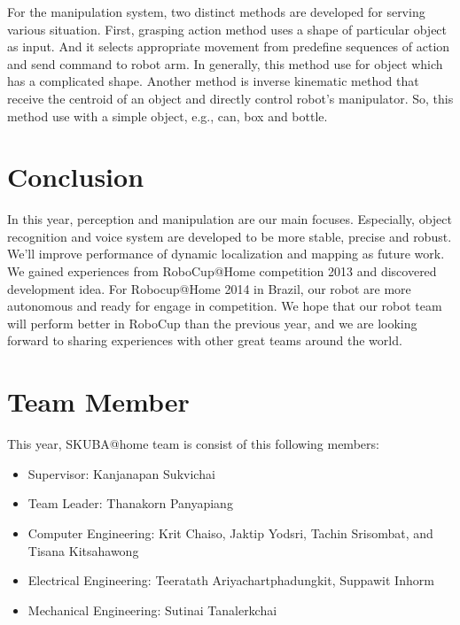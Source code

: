 \documentclass{llncs}
\begin{document}
For the manipulation system, two distinct methods are developed for serving various situation. First, grasping action method uses a shape of particular object as input. And it selects appropriate movement from predefine sequences of action and send command to robot arm. In generally, this method use for object which has a complicated shape. Another method is inverse kinematic method that receive the centroid of an object and directly control robot's manipulator. So, this method use with a simple object, e.g., can, box and bottle.

\section{Conclusion}

In this year, perception and manipulation are our main focuses. Especially, object recognition and voice system are developed to be more stable, precise and robust. We'll improve performance of dynamic localization and mapping as future work. We gained experiences from RoboCup@Home competition 2013 and discovered development idea. For Robocup@Home 2014 in Brazil, our robot are more autonomous and ready for engage in competition. We hope that our robot team will perform better in RoboCup than the previous year, and we are looking forward to sharing experiences with other great teams around the world.

\section*{Team Member}

This year, SKUBA@home team is consist of this following members:
\begin{itemize}
\item Supervisor: Kanjanapan Sukvichai
\item Team Leader: Thanakorn Panyapiang
\item Computer Engineering: Krit Chaiso, Jaktip Yodsri, Tachin Srisombat, and Tisana Kitsahawong
\item Electrical Engineering: Teeratath Ariyachartphadungkit, Suppawit Inhorm
\item Mechanical Engineering: Sutinai Tanalerkchai
\end{itemize}
\end{document}
